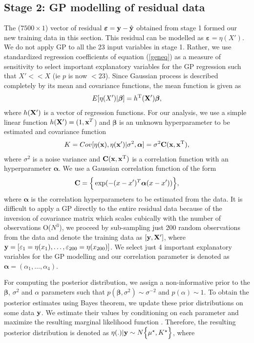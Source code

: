 \documentclass[12pt,titlepage]{report}
\newcommand{\bC}{{\bf C}}
\newcommand{\bx}{{\bf x}}
\newcommand{\bX}{{\bf X}}
\newcommand{\by}{{\bf y}}
\newcommand{\hby}{{\hat {\bf y}}}
\newcommand{\bbeta}{{\boldsymbol{\beta}}}
\theoremstyle{definition}
\theoremstyle{remark}
\begin{document}
\subsection{Stage 2: GP modelling of residual data}\label{GP}
The (${7500\times 1}$) vector of residual $\boldsymbol \varepsilon=\by-\hby$ obtained from stage 1 formed our new training data in this section. This residual can be modelled as $\boldsymbol \varepsilon= \eta(X')$. We do not apply GP to all the 23 input variables in stage 1. Rather, we use standardized regression coefficients of equation (\ref{geneq}) as a measure of sensitivity to select important explanatory variables for the GP regression such that $X'<< X$ (ie $p$ is now $<23$).
Since Gaussian process is described completely by its mean and covariance functions, the mean function is given as
\begin{equation}\label{eqgp3}
E[\eta(X')|\boldsymbol\beta]=h^{\rm T}(\bX')\boldsymbol\beta,
\end{equation}
where $h(\bX')$ is a vector of regression functions. For our analysis, we use a simple linear function $h(\bX') = (1,\bx^T$) and $\boldsymbol\beta$ is an unknown hyperparameter to be estimated and covariance function $$ K={Cov[\eta(\bx),\eta(\bx')|\sigma^{2},\boldsymbol \alpha]=\sigma^{2} \bC(\bx,\bx^{\rm T})},$$ where $\sigma^{2}$ is a noise variance and $\bC(\bx,\bx^{\rm T})$ is a correlation function with an hyperparameter $\boldsymbol \alpha$. We use a Gaussian correlation function of the form
\begin{equation}\label{gaus}
\bC=\Big \{\exp(-(x-x')^T \boldsymbol \alpha (x-x')) \Big\},%
\end{equation}
where $\boldsymbol \alpha$ is the correlation hyperparameters to be estimated from the data. It is difficult to apply a GP directly to the entire residual data because of the inversion of covariance matrix which scales cubically with the number of
observations O($N^3$), we proceed by sub-sampling just 200 random observations from the data and denote the training data as $[\by, \bX']$, where $\by=[ \varepsilon_1= \eta(x_1),\ldots, \varepsilon_{200}= \eta(x_{200})]$. We select just 4 important explanatory variables for the GP modelling and our correlation parameter is denoted as $\boldsymbol \alpha=(\alpha_1,\ldots,\alpha_4)$.

For computing the posterior distribution, we assign a non-informative prior to the $\boldsymbol \beta$, $\sigma^2$ and $\alpha$ parameters such that $p(\bbeta, \sigma^2) \sim \sigma^{-2}$ and $p(\alpha) \sim 1$.
To obtain the posterior estimates using Bayes theorem, we update these prior distributions on some data $\by$. We estimate their values by conditioning on each parameter and maximize the resulting marginal likelihood function \citep{pd7,pd10}. Therefore, the resulting posterior distribution is denoted as $\eta(.)|\by \sim N\Big \{\mu^{\star}, K^{\star} \Big\}$, where
\end{document}
